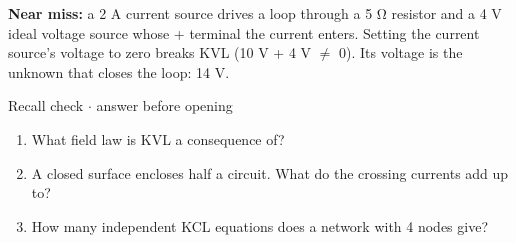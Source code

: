 \documentclass[11pt]{article}
\begin{document}
\begin{keepsection}
\begin{keepsection}
\begin{notebox}\textbf{Near miss:} a 2 A current source drives a loop through a 5 Ω resistor and a 4 V ideal voltage source whose + terminal the current enters. Setting the current source’s voltage to zero breaks KVL (10 V + 4 V \ensuremath{\neq} 0). Its voltage is the unknown that closes the loop: 14 V.\end{notebox}

\begin{recallbox}{Recall check \ensuremath{\cdot} answer before opening}
\begin{enumerate}
\item What field law is KVL a consequence of?
\item A closed surface encloses half a circuit. What do the crossing currents add up to?
\item How many independent KCL equations does a network with 4 nodes give?
\end{enumerate}

\end{recallbox}
\end{keepsection}
\end{keepsection}
\end{document}
